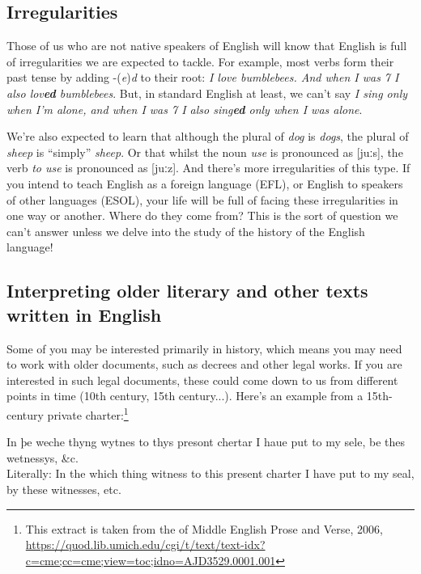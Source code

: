 \subsection{Irregularities}\label{irregularities}
Those of us who are not native speakers of English will know that English is full of irregularities we are expected to tackle. For example, most verbs form their past tense by adding -(\emph{e})\emph{d} to their root: \textit{I love bumblebees. And when I was 7 I also lov\textbf{ed} bumblebees}. But, in standard English at least, we can't say \textit{I sing only when I'm alone, and when I was 7 I also sing\textbf{ed} only when I was alone}.

We're also expected to learn that although the plural of \emph{dog} is \emph{dogs}, the plural of \emph{sheep} is ``simply'' \emph{sheep}. Or that whilst the noun \emph{use} is pronounced as [juːs], the verb \emph{to use} is pronounced as [juːz]. And there's more irregularities of this type. If you intend to teach English as a foreign language (EFL), or English to speakers of other languages (ESOL), your life will be full of facing these irregularities in one way or another. Where do they come from? This is the sort of question we can't answer unless we delve into the study of the history of the English language!

\largerpage[-1]
\subsection{Interpreting older literary and other texts written in English}\label{interpreting-older-texts}
Some of you may be interested primarily in history, which means you may need to work with older documents, such as decrees and other legal works. If you are interested in such legal documents, these could come down to us from different points in time (10th century, 15th century...). Here's an example from a 15th-century private charter:\footnote{This extract is taken from the  of Middle English Prose and Verse, 2006,  \url{https://quod.lib.umich.edu/cgi/t/text/text-idx?c=cme;cc=cme;view=toc;idno=AJD3529.0001.001}}

\begin{exe}
    \ex In þe weche thyng wytnes to thys presont chertar I haue put to my sele, be thes wetnessys, \&c.\\
    Literally: In the which thing witness to this present charter I have put to my seal, by these witnesses, etc.
\end{exe}

